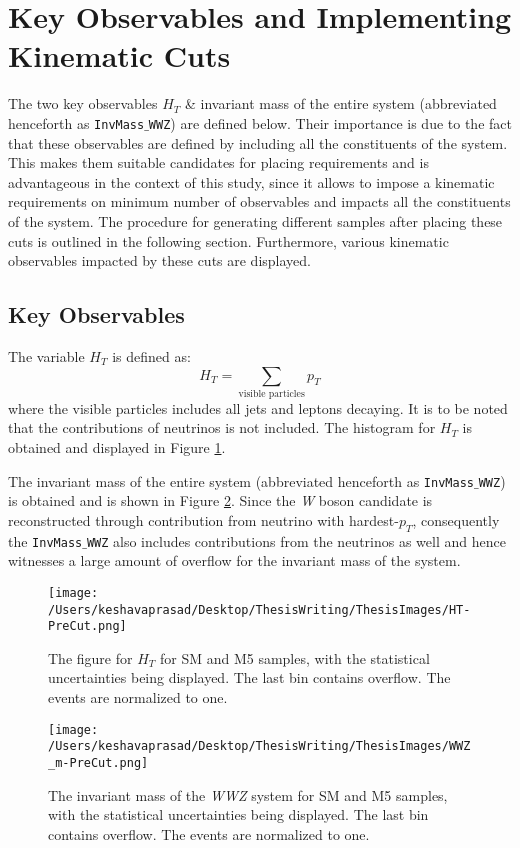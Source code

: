 \section{Key Observables and Implementing Kinematic Cuts}\label{KinematicCuts}
The two key observables $H_{T}$ \& invariant mass of the entire system (abbreviated henceforth as \texttt{InvMass$\_$WWZ}) are defined below. Their importance is due to the fact that these observables are defined by including all the constituents of the system. This makes them suitable candidates for placing requirements and is advantageous in the context of this study, since it allows to impose a kinematic requirements on minimum number of observables and impacts all the constituents of the system. The procedure for generating different samples after placing these cuts is outlined in the following section. Furthermore, various kinematic observables impacted by these cuts are displayed.

\subsection{Key Observables}
The variable $H_{T}$ is defined as:
\begin{equation}
H_{T}  =  \sum_{\text{visible particles}} p_{T}
\end{equation} where the visible particles includes all jets and leptons decaying. It is to be noted that the contributions of neutrinos is not included. The histogram for $H_{T}$ is obtained and displayed in Figure \ref{HT-PreCut}.

The invariant mass of the entire system (abbreviated henceforth as \texttt{InvMass$\_$WWZ}) is obtained and is shown in Figure \ref{InvMass-WWZ-PreCut}. Since the \textit{W} boson candidate is reconstructed through contribution from neutrino with hardest-$p_{T}$, consequently the \texttt{InvMass$\_$WWZ} also includes contributions from the neutrinos as well and hence witnesses a large amount of overflow for the invariant mass of the system.
\begin{figure}[!htb]
	\centering
	\texttt{[image: /Users/keshavaprasad/Desktop/ThesisWriting/ThesisImages/HT-PreCut.png]}
	\caption{The figure for $H_{T}$ for SM and M5 samples, with the statistical uncertainties being displayed. The last bin contains overflow. The events are normalized to one.}
	\label{HT-PreCut}
\end{figure}

\begin{figure}[!htb]
	\centering
	\texttt{[image: /Users/keshavaprasad/Desktop/ThesisWriting/ThesisImages/WWZ\_m-PreCut.png]}
	\caption{The invariant mass of the \textit{WWZ} system for SM and M5 samples, with the statistical uncertainties being displayed. The last bin contains overflow. The events are normalized to one.}
	\label{InvMass-WWZ-PreCut}
\end{figure}

